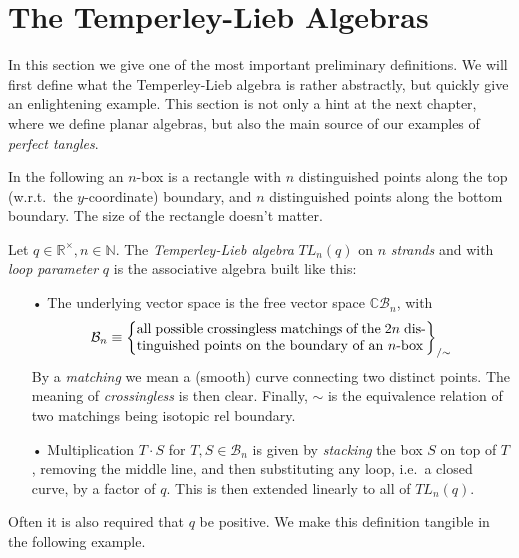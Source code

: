 \section{The Temperley-Lieb Algebras}
In this section we give one of the most important preliminary definitions. We will first define what the Temperley-Lieb algebra is rather abstractly, but quickly give an enlightening example. This section is not only a hint at the next chapter, where we define planar algebras, but also the main source of our examples of \emph{perfect tangles}.

\bigno In the following an $n$-box is a rectangle with $n$ distinguished points along the top (w.r.t.\ the $y$-coordinate) boundary, and $n$ distinguished points along the bottom boundary. The size of the rectangle doesn't matter.
\begin{definition}\label{def:TLalgebra}
Let $q\in\mathbb{R}^\times, n\in\mathbb{N}$. The \emph{Temperley-Lieb algebra} $TL_n(q)$ on $n$ \emph{strands} and with \emph{loop parameter} $q$ is the associative algebra built like this:
\begin{itemize}
\item[•] The underlying vector space is the free vector space $\mathbb{C}\mathcal{B}_n$, with
	\begin{align*}
		\mathcal{B}_n \equiv
		\left\{
		\begin{minipage}{0.6\textwidth}
			all possible crossingless matchings of the $2n$ distinguished points on the boundary of an $n$-box
		\end{minipage}
		\right\}_{/\sim}
	\end{align*}
	By a \emph{matching} we mean a (smooth) curve connecting two distinct points. The meaning of \emph{crossingless} is then clear. Finally, $\sim$ is the equivalence relation of two matchings being isotopic rel boundary.
\item[•] Multiplication $T\cdot S$ for $T,S\in \mathcal{B}_n$ is given by \emph{stacking} the box $S$ on top of $T$, removing the middle line, and then substituting any loop, i.e.\ a closed curve, by a factor of $q$. This is then extended linearly to all of $TL_n(q)$.
\end{itemize}
\end{definition}
Often it is also required that $q$ be positive. We make this definition tangible in the following example.
